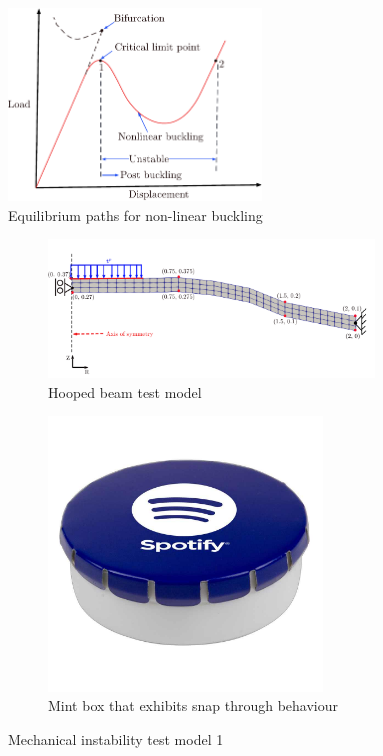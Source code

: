 \documentclass[11pt,a4paper,final]{article}
\begin{document}
\begin{figure}[h]
\centering 
\includegraphics[width=0.6\textwidth]{nonlinear_eq_path.pdf}
\caption{Equilibrium paths for non-linear buckling}
\label{fig:1.8}
\end{figure}

\begin{figure}[ht!]
\centering
\begin{subfigure}[b]{0.7\textwidth}
\centering
\includegraphics[width=0.95\textwidth]{hooped_beam_grid.pdf}
\caption{Hooped beam test model}
\label{fig:1.6.1}
\end{subfigure}
\begin{subfigure}[b]{0.29\textwidth}
\centering
\includegraphics[width=0.8\textwidth]{snap_top_mint_box.jpg}
\caption{Mint box that exhibits snap through behaviour}
\label{fig:1.6.2}
\end{subfigure}
\caption{Mechanical instability test model 1}
\label{fig:1.6}
\end{figure}
\end{document}
